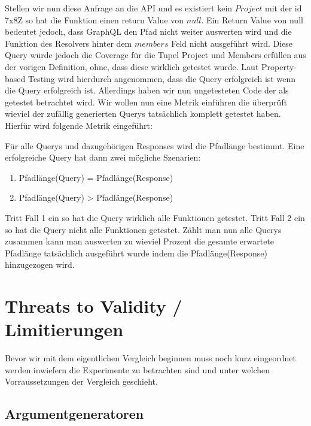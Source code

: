 Stellen wir nun diese Anfrage an die API und es existiert kein $Project$ mit der id 7x8Z so hat die Funktion
einen return Value von $null$.
Ein Return Value von null bedeutet jedoch, dass GraphQL den Pfad nicht weiter auswerten wird und die Funktion des Resolvers hinter dem $members$ Feld nicht ausgeführt wird.
Diese Query würde jedoch die Coverage für die Tupel Project und Members erfüllen aus der vorigen Definition, ohne, dass diese wirklich getestet wurde.
Laut Property-based Testing wird hierdurch angenommen, dass die Query erfolgreich ist wenn die Query erfolgreich ist.
Allerdings haben wir nun ungetesteten Code der als getestet betrachtet wird.
Wir wollen nun eine Metrik einführen die überprüft wieviel der zufällig generierten Querys tatsächlich komplett getestet haben.
Hierfür wird folgende Metrik eingeführt:

\begin{definition}
    Für alle Querys und dazugehörigen Responses wird die Pfadlänge bestimmt.
    Eine erfolgreiche Query hat dann zwei mögliche Szenarien:
        \begin{enumerate}
            \item Pfadlänge(Query) = Pfadlänge(Response)
            \item Pfadlänge(Query) > Pfadlänge(Response)
        \end{enumerate}
\end{definition}

Tritt Fall 1 ein so hat die Query wirklich alle Funktionen getestet.
Tritt Fall 2 ein so hat die Query nicht alle Funktionen getestet.
Zählt man nun alle Querys zusammen kann man auswerten zu wieviel Prozent die gesamte erwartete Pfadlänge tatsächlich ausgeführt wurde indem die Pfadlänge(Response) hinzugezogen wird.

\section{Threats to Validity / Limitierungen}

Bevor wir mit dem eigentlichen Vergleich beginnen muss noch kurz eingeordnet werden inwiefern die Experimente zu betrachten
sind und unter welchen Vorraussetzungen der Vergleich geschieht.

\subsection{Argumentgeneratoren}

